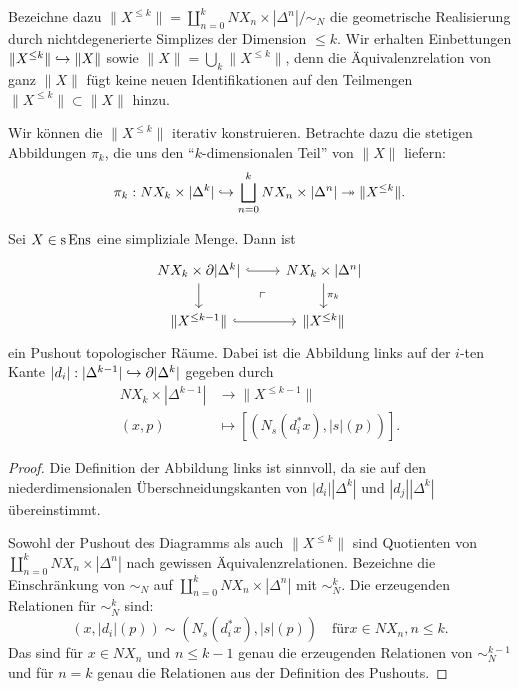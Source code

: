 Bezeichne dazu $\|X^{\leq k}\| = \coprod_{n = 0}^k NX_n \times
|\Delta^n| / \sim_N $ die geometrische Realisierung durch
nichtdegenerierte Simplizes der Dimension $\leq k$. Wir erhalten
Einbettungen $\|X^{\leq k}\| \hookrightarrow \|X\|$ sowie $\|X\| = \bigcup_k
\|X^{\leq k}\|$, denn die Äquivalenzrelation von ganz $\|X\|$ fügt
keine neuen Identifikationen auf den Teilmengen $\|X^{\leq k}\|
\subset \|X\|$ hinzu.

Wir können die $\|X^{\leq k}\|$ iterativ konstruieren. Betrachte dazu
die stetigen Abbildungen $\pi_k$, die uns den ``$k$-dimensionalen
Teil'' von $\|X\|$ liefern:
\[ \pi_k: NX_k \times |\Delta^k|
  \hookrightarrow \bigsqcup_{n=0}^k NX_n \times |\Delta^n|
  \twoheadrightarrow \|X^{\leq k}\|. \]

\begin{prop}
  Sei $X \in \operatorname{s}\operatorname{Ens}$ eine simpliziale Menge. Dann ist
  \[ \begin{tikzcd}
    NX_k \times \del |\Delta^k| \arrow[r, hook] \arrow[d]
    \arrow[dr, phantom, "\ulcorner"]
    & NX_k \times |\Delta^n| \arrow[d, "\pi_k"] \\
    \|X^{\leq k-1}\| \arrow[r, hook]
    & \|X^{\leq k}\|
  \end{tikzcd} \]
  ein Pushout topologischer Räume. Dabei ist die Abbildung links auf
  der $i$-ten Kante $|d_i|: |\Delta^{k-1}| \hookrightarrow \partial |\Delta^k|$
  gegeben durch
  \begin{align*}
    NX_k \times |\Delta^{k-1}| &\to \|X^{\leq k-1}\| \\
    (x, p) &\mapsto [(N_s(d_i^* x), |s|(p))].
  \end{align*}
\end{prop}
\begin{proof}
  Die Definition der Abbildung links ist sinnvoll, da sie auf den
  niederdimensionalen Überschneidungskanten von $|d_i| |\Delta^k|$ und
  $|d_j| |\Delta^k|$ übereinstimmt.
  
  Sowohl der Pushout des Diagramms als auch $\|X^{\leq k}\|$ sind
  Quotienten von $\coprod_{n=0}^k NX_n \times |\Delta^n|$ nach
  gewissen Äquivalenzrelationen. Bezeichne die Einschränkung von
  $\sim_N$ auf $\coprod_{n=0}^k NX_n \times |\Delta^n|$ mit
  $\sim_N^k$. Die erzeugenden Relationen für $\sim_N^k$ sind:
  \[ (x, |d_i|(p)) \sim (N_s(d_i^* x), |s|(p))
  \quad \text{für} x \in NX_n, n \leq k. \]
  Das sind für $x \in NX_n$ und $n \leq k-1$ genau die erzeugenden
  Relationen von $\sim_N^{k-1}$ und für $n = k$ genau die Relationen
  aus der Definition des Pushouts.
\end{proof}

